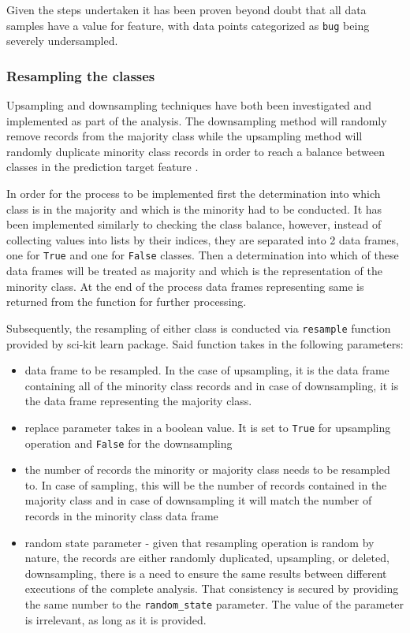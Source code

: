Given the steps undertaken it has been proven beyond doubt that all data samples have a value for \isBug{} feature, with data points categorized as \texttt{bug} being severely undersampled.

\subsubsection{Resampling the classes}\label{sec:impl-data-analysis:resampling}
Upsampling and downsampling techniques have both been investigated and implemented as part of the analysis. The downsampling method will randomly remove records from the majority class while the upsampling method will randomly duplicate minority class records in order to reach a balance between classes in the prediction target feature \isBug{}. 

In order for the process to be implemented first the determination into which class is in the majority and which is the minority had to be conducted. It has been implemented similarly to checking the class balance, however, instead of collecting values into lists by their indices, they are separated into 2 data frames, one for \texttt{True} and one for \texttt{False} classes. Then a determination into which of these data frames will be treated as majority and which is the representation of the minority class. At the end of the process data frames representing same is returned from the function for further processing.

Subsequently, the resampling of either class is conducted via \texttt{resample} function provided by sci-kit learn package. Said function takes in the following parameters:
\begin{itemize}
    \item data frame to be resampled. In the case of upsampling, it is the data frame containing all of the minority class records and in case of downsampling, it is the data frame representing the majority class.
    \item replace parameter takes in a boolean value. It is set to \texttt{True} for upsampling operation and \texttt{False} for the downsampling
    \item the number of records the minority or majority class needs to be resampled to. In case of sampling, this will be the number of records contained in the majority class and in case of downsampling it will match the number of records in the minority class data frame
    \item random state parameter - given that resampling operation is random by nature, the records are either randomly duplicated, upsampling, or deleted, downsampling, there is a need to ensure the same results between different executions of the complete analysis. That consistency is secured by providing the same number to the \texttt{random\_state} parameter. The value of the parameter is irrelevant, as long as it is provided.
\end{itemize}

